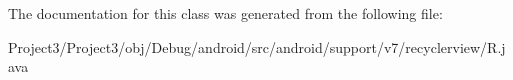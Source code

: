 The documentation for this class was generated from the following file\+:\begin{DoxyCompactItemize}
\item 
Project3/\+Project3/obj/\+Debug/android/src/android/support/v7/recyclerview/R.\+java\end{DoxyCompactItemize}
